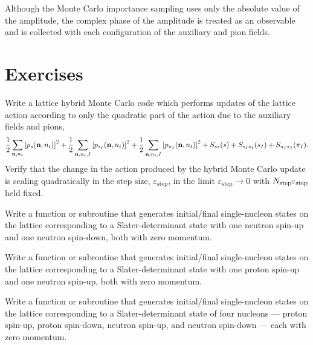 Although the Monte Carlo importance sampling uses only the absolute value of the amplitude, the complex phase
of the amplitude is treated as an observable and is collected  with each
configuration of the auxiliary and pion fields.

\section{Exercises}

\begin{prob}
\label{prob6.1}
Write a lattice hybrid Monte Carlo code which performs updates of the lattice action according to only the quadratic part of the action due to the auxiliary fields and pions,
\begin{equation}
\frac{1}{2}\sum_{{\bf n},n_t}\left[p_s({{\bf n},n_t})\right]^{2}+\frac{1}{2}\sum_{{\bf
n},n_t,I}\left[  p_{s_I}({{\bf n},n_t})\right]^{2}+\frac{1}{2}\sum_{{\bf
n},n_t,I}\left[p_{\pi_I}({{\bf n},n_t})\right]^{2}+S_{ss}(s) + S_{s_Is_I}(s_I)
+ S_{\pi_I\pi_I}(\pi_I).
\end{equation} 
Verify that the change in the action produced by the hybrid Monte Carlo update is scaling quadratically in the step size, $\varepsilon_{\mathrm{step}}$, in the limit $\varepsilon_{\mathrm{step}} \rightarrow 0$ with $N_{\rm step}\varepsilon_{\mathrm{step}}$ held fixed. 
\end{prob} 

\begin{prob}
\label{prob6.2}
Write a function or subroutine that generates initial/final single-nucleon states on the lattice corresponding to a Slater-determinant state with one neutron spin-up and one neutron spin-down, both with zero momentum. \end{prob} 

\begin{prob}
\label{prob6.3}
Write a function or subroutine that generates initial/final single-nucleon
states on the lattice corresponding to a Slater-determinant state with one proton spin-up and one neutron spin-up, both with zero momentum.\end{prob}

\begin{prob}
\label{prob6.4}
Write a function or subroutine that generates initial/final single-nucleon
states on the lattice corresponding to a Slater-determinant state of four
nucleons --- proton spin-up, proton spin-down, neutron spin-up, and neutron
spin-down --- each with zero momentum. \end{prob}

